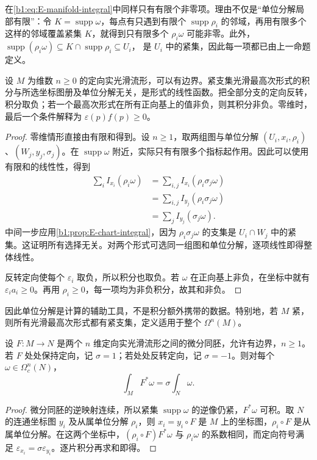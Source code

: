 在\eqref{b1:eq:E-manifold-integral}中同样只有有限个非零项。理由不仅是“单位分解局部有限”：令 \(K=\operatorname{supp}\omega\)，每点有只遇到有限个 \(\operatorname{supp}\rho_i\) 的邻域，再用有限多个这样的邻域覆盖紧集 \(K\)，就得到只有限多个 \(\rho_i\omega\) 可能非零。此外，
\(\operatorname{supp}(\rho_i\omega)\subseteq K\cap\operatorname{supp}\rho_i\subseteq U_i\)，
是 \(U_i\) 中的紧集，因此每一项都已由上一命题定义。

\begin{proposition}\label{b1:prop:E-integral-independent}
设 \(M\) 为维数 \(n\geq0\) 的定向实光滑流形，可以有边界。紧支集光滑最高次形式的积分与所选坐标图册及单位分解无关，是形式的线性函数。把全部分支的定向反转，积分取负；若一个最高次形式在所有正向基上的值非负，则其积分非负。零维时，最后一个条件解释为 \(\varepsilon(p)f(p)\geq0\)。
\end{proposition}
\begin{proof}
零维情形直接由有限和得到。设 \(n\geq1\)，取两组图与单位分解 \((U_i,x_i,\rho_i)\)、\((W_j,y_j,\sigma_j)\)。在 \(\operatorname{supp}\omega\) 附近，实际只有有限多个指标起作用。因此可以使用有限和的线性性，得到
\[
 \begin{aligned}
 \sum_i I_{x_i}(\rho_i\omega)
 &=\sum_{i,j}I_{x_i}(\rho_i\sigma_j\omega)\\
 &=\sum_{i,j}I_{y_j}(\rho_i\sigma_j\omega)\\
 &=\sum_jI_{y_j}(\sigma_j\omega).
 \end{aligned}
\]
中间一步应用\cref{b1:prop:E-chart-integral}，因为
\(\rho_i\sigma_j\omega\) 的支集是 \(U_i\cap W_j\) 中的紧集。这证明所有选择无关。对两个形式可选同一组图和单位分解，逐项线性即得整体线性。

反转定向使每个 \(\varepsilon_i\) 取负，所以积分也取负。若 \(\omega\) 在正向基上非负，在坐标中就有 \(\varepsilon_i a_i\geq0\)。再用 \(\rho_i\geq0\)，每一项均为非负积分，故其和非负。
\end{proof}

因此单位分解是计算的辅助工具，不是积分额外携带的数据。特别地，若 \(M\) 紧，则所有光滑最高次形式都有紧支集，定义适用于整个 \(\Omega^n(M)\)。

\begin{proposition}\label{b1:prop:E-integral-diffeomorphism}
设 \(F:M\longrightarrow N\) 是两个 \(n\) 维定向实光滑流形之间的微分同胚，允许有边界，\(n\geq1\)。若 \(F\) 处处保持定向，记 \(\sigma=1\)；若处处反转定向，记 \(\sigma=-1\)。则对每个 \(\omega\in\Omega_c^n(N)\)，
\[
 \int_MF^*\omega=\sigma\int_N\omega.
\]
\end{proposition}
\begin{proof}
微分同胚的逆映射连续，所以紧集 \(\operatorname{supp}\omega\) 的逆像仍紧，\(F^*\omega\) 可积。取 \(N\) 的连通坐标图 \(y_i\) 及从属单位分解 \(\rho_i\)，则 \(x_i=y_i\circ F\) 是 \(M\) 上的坐标图，\(\rho_i\circ F\) 是从属单位分解。在这两个坐标中，\((\rho_i\circ F)F^*\omega\) 与 \(\rho_i\omega\) 的系数相同，而定向符号满足 \(\varepsilon_{x_i}=\sigma\varepsilon_{y_i}\)。逐片积分再求和即得。
\end{proof}

